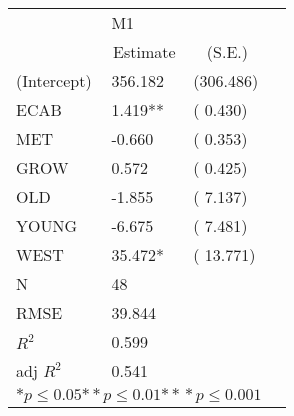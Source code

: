 \begin{tabular}{@{}l*{3}{l}@{}}
\hline
  &\multicolumn{2}{l}{M1  }\tabularnewline
 &\multicolumn{1}{c}{Estimate}&\multicolumn{1}{c}{(S.E.)}\tabularnewline
 \hline
 \hline
  (Intercept) & 356.182 & (306.486) \tabularnewline
  ECAB & 1.419** & (  0.430) \tabularnewline
  MET & -0.660 & (  0.353) \tabularnewline
  GROW & 0.572 & (  0.425) \tabularnewline
  OLD & -1.855 & (  7.137) \tabularnewline
  YOUNG & -6.675 & (  7.481) \tabularnewline
  WEST & 35.472* & ( 13.771) \tabularnewline
 \hline
 N&\multicolumn{1}{l}{48}  & \tabularnewline
 RMSE&39.844\tabularnewline
 $R^2$&0.599\tabularnewline
 adj $R^2$&0.541\tabularnewline
 \hline
\hline
 
 \multicolumn{3}{l}{  ${*  p}\le 0.05$${*\!\!*  p}\le 0.01$${*\!\!*\!\!*  p}\le 0.001$}\tabularnewline
 \end{tabular}